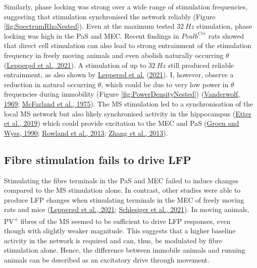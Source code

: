 \documentclass[
  12pt,
  a4paper,
  openany]{book}
\begin{document}
Similarly, phase locking was strong over a wide range of stimulation frequencies, suggesting that stimulation synchronised the network reliably (Figure \ref{fig:SpectrumRhoNested}). Even at the maximum tested \(32\ Hz\) stimulation, phase locking was high in the PaS and MEC. Recent findings in \(Pvalb^{Cre}\) rats showed that direct cell stimulation can also lead to strong entrainment of the stimulation frequency in freely moving animals and even abolish naturally occurring \(\theta\) (\protect\hyperlink{ref-lepperod_optogenetic_2021}{Lepperød et al., 2021}). A stimulation of up to \(32\ Hz\) still produced reliable entrainment, as also shown by \protect\hyperlink{ref-lepperod_optogenetic_2021}{Lepperød et al.} (\protect\hyperlink{ref-lepperod_optogenetic_2021}{2021}). I, however, observe a reduction in natural occurring \(\theta\), which could be due to very low power in \(\theta\) frequencies during immobility (Figure \ref{fig:PowerDensityNested}) (\protect\hyperlink{ref-vanderwolf_hippocampal_1969}{Vanderwolf, 1969}; \protect\hyperlink{ref-mcfarland_relationship_1975}{McFarland et al., 1975}). The MS stimulation led to a synchronisation of the local MS network but also likely synchronised activity in the hippocampus (\protect\hyperlink{ref-etter_optogenetic_2019}{Etter et al., 2019}) which could provide excitation to the MEC and PaS (\protect\hyperlink{ref-van_groen_connections_1990}{Groen and Wyss, 1990}; \protect\hyperlink{ref-rowland_transgenically_2013}{Rowland et al., 2013}; \protect\hyperlink{ref-zhang_optogenetic_2013}{Zhang et al., 2013}).

\hypertarget{fibre-stimulation-fails-to-drive-lfp}{%
\subsection{Fibre stimulation fails to drive LFP}\label{fibre-stimulation-fails-to-drive-lfp}}

Stimulating the fibre terminals in the PaS and MEC failed to induce changes compared to the MS stimulation alone. In contrast, other studies were able to produce LFP changes when stimulating terminals in the MEC of freely moving rats and mice (\protect\hyperlink{ref-lepperod_optogenetic_2021}{Lepperød et al., 2021}; \protect\hyperlink{ref-schlesiger_two_2021}{Schlesiger et al., 2021}). In moving animals, PV\textsuperscript{+} fibres of the MS seemed to be sufficient to drive LFP responses, even though with slightly weaker magnitude. This suggests that a higher baseline activity in the network is required and can, thus, be modulated by fibre stimulation alone. Hence, the difference between immobile animals and running animals can be described as an excitatory drive through movement.
\end{document}
